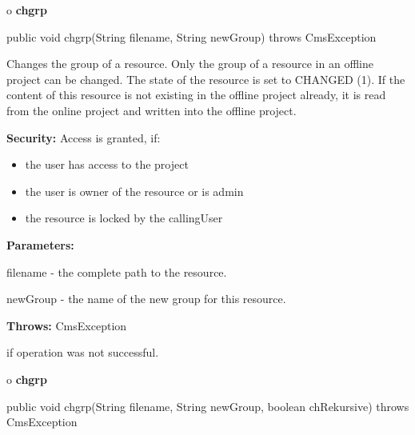 o {\bf chgrp}

\begin{PRE}
 public void chgrp(String filename,
                   String newGroup) throws CmsException
\end{PRE}

\begin{description}
\htmlDD Changes the group of a resource. \htmlBR
Only the group of a resource in an offline project can be changed. The state
of the resource is set to CHANGED (1). If the content of this resource is not
existing in the offline project already, it is read from the online project
and written into the offline project.

{\bf Security:} Access is granted, if:

\begin{itemize}
\item the user has access to the project
\item the user is owner of the resource or is admin
\item the resource is locked by the callingUser
\end{itemize}

\begin{description}
\item {\bf Parameters:}

filename - the complete path to the resource.

newGroup - the name of the new group for this resource.
\item {\bf Throws:} CmsException

if operation was not successful.
\end{description}

\end{description}

o {\bf chgrp}

\begin{PRE}
 public void chgrp(String filename,
                   String newGroup,
                   boolean chRekursive) throws CmsException
\end{PRE}

